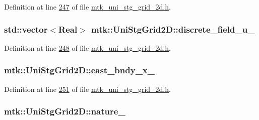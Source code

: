 Definition at line \hyperlink{mtk__uni__stg__grid__2d_8h_source_l00247}{247} of file \hyperlink{mtk__uni__stg__grid__2d_8h_source}{mtk\-\_\-uni\-\_\-stg\-\_\-grid\-\_\-2d.\-h}.

\hypertarget{classmtk_1_1UniStgGrid2D_a4cc4df94c1049db1eb0831f8eb72b3c0}{
\subsubsection[{discrete\-\_\-field\-\_\-u\-\_\-}]{\setlength{\rightskip}{0pt plus 5cm}std\-::vector$<${\bf Real}$>$ mtk\-::\-Uni\-Stg\-Grid2\-D\-::discrete\-\_\-field\-\_\-u\-\_\-\hspace{0.3cm}{\ttfamily [private]}}}\label{classmtk_1_1UniStgGrid2D_a4cc4df94c1049db1eb0831f8eb72b3c0}


Definition at line \hyperlink{mtk__uni__stg__grid__2d_8h_source_l00248}{248} of file \hyperlink{mtk__uni__stg__grid__2d_8h_source}{mtk\-\_\-uni\-\_\-stg\-\_\-grid\-\_\-2d.\-h}.

\hypertarget{classmtk_1_1UniStgGrid2D_ab3877c2f4542b7f7486bf24a04f8a806}{
\subsubsection[{east\-\_\-bndy\-\_\-x\-\_\-}]{ mtk\-::\-Uni\-Stg\-Grid2\-D\-::east\-\_\-bndy\-\_\-x\-\_\-\hspace{0.3cm}{\ttfamily [private]}}}\label{classmtk_1_1UniStgGrid2D_ab3877c2f4542b7f7486bf24a04f8a806}


Definition at line \hyperlink{mtk__uni__stg__grid__2d_8h_source_l00251}{251} of file \hyperlink{mtk__uni__stg__grid__2d_8h_source}{mtk\-\_\-uni\-\_\-stg\-\_\-grid\-\_\-2d.\-h}.

\hypertarget{classmtk_1_1UniStgGrid2D_ac8b66740d328803f7fbabd1c42c775b2}{
\subsubsection[{nature\-\_\-}]{ mtk\-::\-Uni\-Stg\-Grid2\-D\-::nature\-\_\-\hspace{0.3cm}{\ttfamily [private]}}}\label{classmtk_1_1UniStgGrid2D_ac8b66740d328803f7fbabd1c42c775b2}


